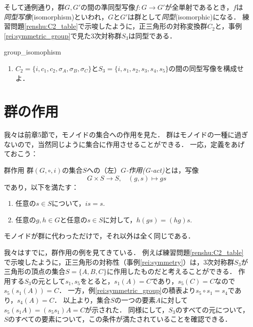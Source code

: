 \documentclass[11pt,a4paper]{jsarticle}
\begin{document}
そして通例通り，群$G, G'$の間の準同型写像$f:G \to G'$が全単射であるとき，$f$は\emph{同型写像}(isomorphism)といわれ，$G$と$G'$は群として\emph{同型}(isomorphic)になる．
練習問題\ref{renshu:C2_table}で示唆したように，正三角形の対称変換群$C_2$と，事例\ref{rei:symmetric_group}で見た3次対称群$S_3$は同型である．

\begin{renshu}{}{group_isomophism}
    \begin{enumerate}
        \item $C_2 = \{i, c_1, c_2, \sigma_A, \sigma_B, \sigma_C\}$と$S_3 = \{i, s_1, s_2, s_3, s_4, s_5\}$の間の同型写像を構成せよ．
    \end{enumerate}
    
\end{renshu}

\section{群の作用}
我々は前章5節で，モノイドの集合への作用を見た．
群はモノイドの一種に過ぎないので，当然同じように集合に作用させることができる．
一応，定義をあげておこう：
\begin{dfn}{群作用}{}
    群$(G, \circ, i)$の集合$S$への（左）\emph{$G$-作用(G-act)}とは，写像
    \[
     G \times S \to S, \ \ \ \ (g, s) \mapsto gs
    \]
    であり，以下を満たす：
    \begin{enumerate}
     \item 任意の$s \in S$について，$is = s$.
     \item 任意の$g, h \in G$と任意の$s \in S$に対して，$h(gs) = (hg)s$.
    \end{enumerate}
\end{dfn}
モノイドが群に代わっただけで，それ以外は全く同じである．

我々はすでに，群作用の例を見てきている．
例えば練習問題\ref{renshu:C2_table}で示唆したように，正三角形の対称性（事例\ref{rei:symmetry}）は，3次対称群$S_3$が三角形の頂点の集合$S = \{A, B, C\}$に作用したものだと考えることができる．
作用する$S_3$の元として$s_1, s_5$をとると，$s_1(A)=C$であり，$s_5(C)=C$なので$s_5 (s_1 (A)) = C$．
一方，例\ref{rei:symmetric_group}の積表より$s_5 \circ s_1 = s_4$であり，$s_4(A)=C$．
以上より，集合$S$の一つの要素$A$に対して$s_5(s_1 A) = (s_5 s_1)A = C$が示された．
同様にして，$S_3$のすべての元について，$S$のすべての要素について，この条件が満たされていることを確認できる．
\end{document}
